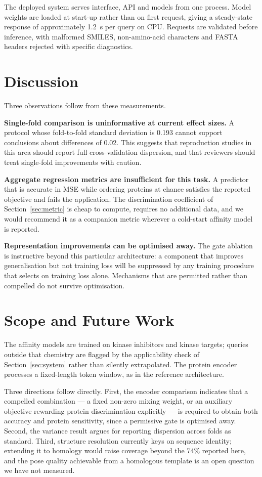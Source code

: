 \documentclass[conference]{IEEEtran}
\begin{document}
The deployed system serves interface, API and models from one process. Model weights are loaded at
start-up rather than on first request, giving a steady-state response of approximately 1.2~s per
query on CPU. Requests are validated before inference, with malformed SMILES, non-amino-acid
characters and FASTA headers rejected with specific diagnostics.

\section{Discussion}

Three observations follow from these measurements.

\textbf{Single-fold comparison is uninformative at current effect sizes.} A protocol whose
fold-to-fold standard deviation is 0.193 cannot support conclusions about differences of 0.02. This
suggests that reproduction studies in this area should report full cross-validation dispersion, and
that reviewers should treat single-fold improvements with caution.

\textbf{Aggregate regression metrics are insufficient for this task.} A predictor that is accurate
in MSE while ordering proteins at chance satisfies the reported objective and fails the application.
The discrimination coefficient of Section~\ref{sec:metric} is cheap to compute, requires no
additional data, and we would recommend it as a companion metric wherever a cold-start affinity
model is reported.

\textbf{Representation improvements can be optimised away.} The gate ablation is instructive beyond
this particular architecture: a component that improves generalisation but not training loss will be
suppressed by any training procedure that selects on training loss alone. Mechanisms that are
permitted rather than compelled do not survive optimisation.

\section{Scope and Future Work}

The affinity models are trained on kinase inhibitors and kinase targets; queries outside that
chemistry are flagged by the applicability check of Section~\ref{sec:system} rather than silently
extrapolated. The protein encoder processes a fixed-length token window, as in the reference
architecture.

Three directions follow directly. First, the encoder comparison indicates that a compelled
combination --- a fixed non-zero mixing weight, or an auxiliary objective rewarding protein
discrimination explicitly --- is required to obtain both accuracy and protein sensitivity, since a
permissive gate is optimised away. Second, the variance result argues for reporting dispersion
across folds as standard. Third, structure resolution currently keys on sequence identity;
extending it to homology would raise coverage beyond the 74\% reported here, and the pose quality
achievable from a homologous template is an open question we have not measured.
\end{document}
